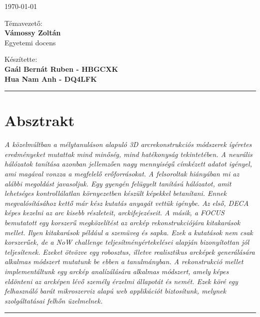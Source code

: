 \documentclass[12pt,a4]{article}
\begin{document}
\begin{titlepage}
\begin{center}
			\vspace{0.2cm}
			\large
			\today
			
			\vspace{1cm}
			
			Témavezető:\\
			\textbf{Vámossy Zoltán}\\
			Egyetemi docens
			
			\vspace{1cm}
			
			Készítette:\\
			\textbf{Gaál Bernát Ruben - HBGCXK\\
			Hua Nam Anh - DQ4LFK}					
		\end{center}
	\end{titlepage}
	\renewcommand*\contentsname{Tartalomjegyzék}
	\tableofcontents
	\newpage
	\par\noindent\rule{\textwidth}{0.4pt}
	\section*{Absztrakt}
     \emph{
		A közelmúltban a mélytanuláson alapuló 3D arcrekonstrukciós módszerek
		ígéretes eredményeket mutattak mind minőség, mind hatékonyság tekintetében. A neurális hálózatok tanítása azonban jellemzően nagy mennyiségű címkézett
		adatot igényel, ami magával vonzza a megfelelő erőforrásokat.
		A felsoroltak hiányában mi az alábbi megoldást javasoljuk. Egy gyengén
		felügyelt tanítású hálózatot, amit lehetséges kontrollálatlan környezetben készült képekkel betanítani.
		Ennek megvalósításához kettő már kész kutatás anyagát vettük igénybe. Az
		első, \cite{deca}DECA képes kezelni az arc kisebb részleteit, arckifejezéseit. A
		másik, a \cite{focus}FOCUS bemutatott egy korszerű megközelítést az arckép rekonstrukciójára kitakarások mellet. Ilyen kitakarások például a szemüveg és sapka. Ezek a kutatások nem csak korszerűek, de a NoW challenge teljesítményértekelései alapján bizonyítottan jól teljesítenek. Ezeket ötvözve egy robosztus, illetve realisztikus
		arcképek generálására alkalmas módszert mutatunk be ebben a tanulmányban.
		A rekonstrukció mellet implementáltunk egy arckép analízálására alkalmas módszert, amely képes eldönteni az arcképen lévő személy érzelmi
		állapotát és nemét. Ezek köré egy felhasználó barát mikroszerviz alapú web
		applikációt biztosítunk, melynek szolgáltatásai felhőn üzelmelnek.
		}
	   \par\noindent\rule{\textwidth}{0.4pt}
\end{document}
